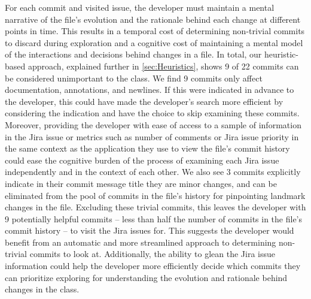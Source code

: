 For each commit and visited issue, the developer must maintain a mental narrative of the file's evolution and the rationale behind each change at different points in time. 
This results in a temporal cost of determining non-trivial commits to discard during exploration and a cognitive cost of maintaining a mental model of the interactions and decisions behind changes in a file. 
In total, our heuristic-based approach, explained further in \autoref{sec:Heuristics}, shows 9 of 22 commits can be considered unimportant to the  class. 
We find 9 commits only affect documentation, annotations, and newlines.
If this were indicated in advance to the developer, this could have made the developer's search more efficient 
by considering the indication and have the choice to skip examining these commits.
Moreover, providing the developer with ease of access to a sample of information in the Jira issue or metrics such as number of comments or Jira issue priority in the same context as the application they use 
to view the file's commit history could ease the cognitive burden of the process of examining each Jira issue independently and in the context of each other.
We also see 3 commits explicitly indicate in their commit message title they are minor changes, 
and can be eliminated from the pool of commits in the file's history for pinpointing landmark changes in the file.
Excluding these trivial commits, this leaves the developer with 9 potentially helpful commits -- less than half the number of commits in the file's commit history -- to visit the Jira issues for.
This suggests the developer would benefit from an automatic and more streamlined approach to determining non-trivial commits to look at.
Additionally, the ability to glean the Jira issue information could help the developer more efficiently decide which commits they can prioritize exploring for understanding the evolution and rationale behind changes in the  class.


